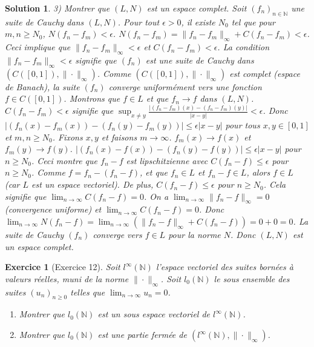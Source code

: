 \documentclass{article}
\newtheorem{solution}{Solution}
\newtheorem{exercise}{Exercice} %
\begin{document}
\begin{solution}
3) Montrer que $(L, N)$ est un espace complet.
Soit $(f_n)_{n \in \mathbb{N}}$ une suite de Cauchy dans $(L, N)$.
Pour tout $\epsilon > 0$, il existe $N_0$ tel que pour $m, n \ge N_0$, $N(f_n - f_m) < \epsilon$.
$N(f_n - f_m) = \|f_n - f_m\|_\infty + C(f_n - f_m) < \epsilon$.
Ceci implique que $\|f_n - f_m\|_\infty < \epsilon$ et $C(f_n - f_m) < \epsilon$.
La condition $\|f_n - f_m\|_\infty < \epsilon$ signifie que $(f_n)$ est une suite de Cauchy dans $(C([0,1]), \| \cdot \|_\infty)$.
Comme $(C([0,1]), \| \cdot \|_\infty)$ est complet (espace de Banach), la suite $(f_n)$ converge uniformément vers une fonction $f \in C([0,1])$.
Montrons que $f \in L$ et que $f_n \to f$ dans $(L, N)$.
$C(f_n - f_m) < \epsilon$ signifie que $\sup_{x \neq y} \frac{|(f_n - f_m)(x) - (f_n - f_m)(y)|}{|x-y|} < \epsilon$.
Donc $|(f_n(x) - f_m(x)) - (f_n(y) - f_m(y))| \le \epsilon |x-y|$ pour tous $x, y \in [0,1]$ et $m, n \ge N_0$.
Fixons $x, y$ et faisons $m \to \infty$. $f_m(x) \to f(x)$ et $f_m(y) \to f(y)$.
$|(f_n(x) - f(x)) - (f_n(y) - f(y))| \le \epsilon |x-y|$ pour $n \ge N_0$.
Ceci montre que $f_n - f$ est lipschitzienne avec $C(f_n - f) \le \epsilon$ pour $n \ge N_0$.
Comme $f = f_n - (f_n - f)$, et que $f_n \in L$ et $f_n - f \in L$, alors $f \in L$ (car $L$ est un espace vectoriel).
De plus, $C(f_n - f) \le \epsilon$ pour $n \ge N_0$. Cela signifie que $\lim_{n \to \infty} C(f_n - f) = 0$.
On a $\lim_{n \to \infty} \|f_n - f\|_\infty = 0$ (convergence uniforme) et $\lim_{n \to \infty} C(f_n - f) = 0$.
Donc $\lim_{n \to \infty} N(f_n - f) = \lim_{n \to \infty} (\|f_n - f\|_\infty + C(f_n - f)) = 0 + 0 = 0$.
La suite de Cauchy $(f_n)$ converge vers $f \in L$ pour la norme $N$.
Donc $(L, N)$ est un espace complet.
\end{solution}

\begin{exercise}[Exercice 12]
Soit $l^\infty(\mathbb{N})$ l'espace vectoriel des suites bornées à valeurs réelles, muni de la norme $\| \cdot \|_\infty$. Soit $l_0(\mathbb{N})$ le sous ensemble des suites $(u_n)_{n \ge 0}$ telles que $\lim_{n \to \infty} u_n = 0$.
\begin{enumerate}
    \item Montrer que $l_0(\mathbb{N})$ est un sous espace vectoriel de $l^\infty(\mathbb{N})$.
    \item Montrer que $l_0(\mathbb{N})$ est une partie fermée de $(l^\infty(\mathbb{N}), \| \cdot \|_\infty)$.
\end{enumerate}
\end{exercise}
\end{document}
